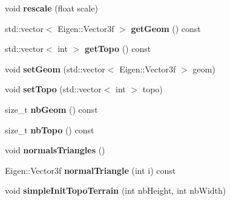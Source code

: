 \begin{DoxyCompactItemize}
\item 
\hypertarget{class_mesh_a02ddb78cd282aaa1aee3c5be3714110d}{}void {\bfseries rescale} (float scale)\label{class_mesh_a02ddb78cd282aaa1aee3c5be3714110d}

\item 
\hypertarget{class_mesh_aadb1a8eb73e41bc00ce79914073c83f5}{}std\+::vector$<$ Eigen\+::\+Vector3f $>$ {\bfseries get\+Geom} () const \label{class_mesh_aadb1a8eb73e41bc00ce79914073c83f5}

\item 
\hypertarget{class_mesh_a4bde57428f9650ced96c8d12e8125981}{}std\+::vector$<$ int $>$ {\bfseries get\+Topo} () const \label{class_mesh_a4bde57428f9650ced96c8d12e8125981}

\item 
\hypertarget{class_mesh_af6f08830a650970c6d824fe63856c599}{}void {\bfseries set\+Geom} (std\+::vector$<$ Eigen\+::\+Vector3f $>$ geom)\label{class_mesh_af6f08830a650970c6d824fe63856c599}

\item 
\hypertarget{class_mesh_afd7c08ccd98c9d0efd2b8a126fec89a1}{}void {\bfseries set\+Topo} (std\+::vector$<$ int $>$ topo)\label{class_mesh_afd7c08ccd98c9d0efd2b8a126fec89a1}

\item 
\hypertarget{class_mesh_ae55ff3af33692f3f186f64a57fb0ab63}{}size\+\_\+t {\bfseries nb\+Geom} () const \label{class_mesh_ae55ff3af33692f3f186f64a57fb0ab63}

\item 
\hypertarget{class_mesh_acacb677fdee9a8af20b9065b9a0e9499}{}size\+\_\+t {\bfseries nb\+Topo} () const \label{class_mesh_acacb677fdee9a8af20b9065b9a0e9499}

\item 
\hypertarget{class_mesh_acd306b83f9a484d90307d40f1f54659d}{}void {\bfseries normals\+Triangles} ()\label{class_mesh_acd306b83f9a484d90307d40f1f54659d}

\item 
\hypertarget{class_mesh_aa4b69ad68d61cb6acd383f6fc70220fa}{}Eigen\+::\+Vector3f {\bfseries normal\+Triangle} (int i) const \label{class_mesh_aa4b69ad68d61cb6acd383f6fc70220fa}

\item 
\hypertarget{class_mesh_a74b52ba5f2cafbd198aeb0c174f94702}{}void {\bfseries simple\+Init\+Topo\+Terrain} (int nb\+Height, int nb\+Width)\label{class_mesh_a74b52ba5f2cafbd198aeb0c174f94702}

\end{DoxyCompactItemize}
